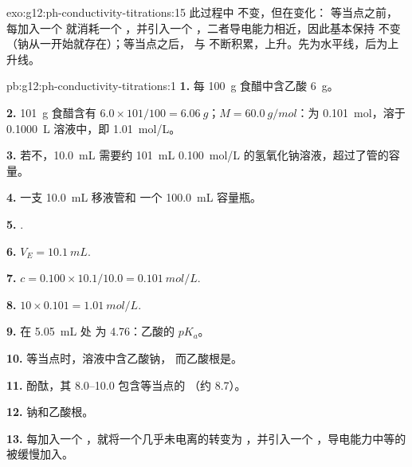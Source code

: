 \begin{solution}{exo:g12:ph-conductivity-titrations:15}
此过程中  不变，但在变化：
等当点之前，每加入一个  就消耗一个 ，并引入一个
，二者导电能力相近，因此基本保持
不变（钠从一开始就存在）；等当点之后， 与 
不断积累，上升。先为水平线，后为上升线。
\end{solution}

\begin{solution}{pb:g12:ph-conductivity-titrations:1}
\textbf{1.} 每 \qty{100}{g} 食醋中含乙酸 \qty{6}{g}。

\textbf{2.} \qty{101}{g} 食醋含有 $6.0 \times 101/100 =
\qty{6.06}{g}$；$M = \qty{60.0}{g/mol}$：为 \qty{0.101}{mol}，溶于
\qty{0.1000}{L} 溶液中，即 \qty{1.01}{mol/L}。

\textbf{3.} 若不，\qty{10.0}{mL} 需要约 \qty{101}{mL}
\qty{0.100}{mol/L} 的氢氧化钠溶液，超过了管的容量。

\textbf{4.} 一支 \qty{10.0}{mL} 移液管和
一个 \qty{100.0}{mL} 容量瓶。

\textbf{5.} .

\textbf{6.} $V_E = \qty{10.1}{mL}$.

\textbf{7.} $c = 0.100 \times 10.1 / 10.0 = \qty{0.101}{mol/L}$.

\textbf{8.} $10 \times 0.101 = \qty{1.01}{mol/L}$.

\textbf{9.} 在 \qty{5.05}{mL} 处  为 4.76：乙酸的 $pK_a$。

\textbf{10.} 等当点时，溶液中含乙酸钠，
而乙酸根是。

\textbf{11.} 酚酞，其 8.0--10.0 包含等当点的 
（约 8.7）。

\textbf{12.} 钠和乙酸根。

\textbf{13.} 每加入一个 ，就将一个几乎未电离的转变为
，并引入一个 ，导电能力中等的
被缓慢加入。


\end{solution}
